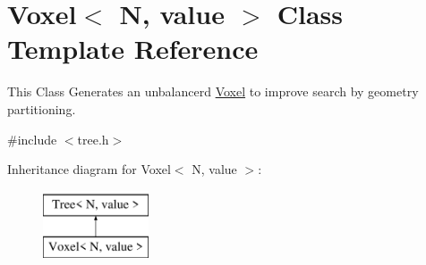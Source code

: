 \hypertarget{classVoxel}{}\section{Voxel$<$ N, value $>$ Class Template Reference}
\label{classVoxel}


This Class Generates an unbalancerd \mbox{\hyperlink{classVoxel}{Voxel}} to improve search by geometry partitioning.  




{\ttfamily \#include $<$tree.\+h$>$}

Inheritance diagram for Voxel$<$ N, value $>$\+:\begin{figure}[H]
\begin{center}
\leavevmode
\includegraphics[height=2.000000cm]{classVoxel}
\end{center}
\end{figure}
